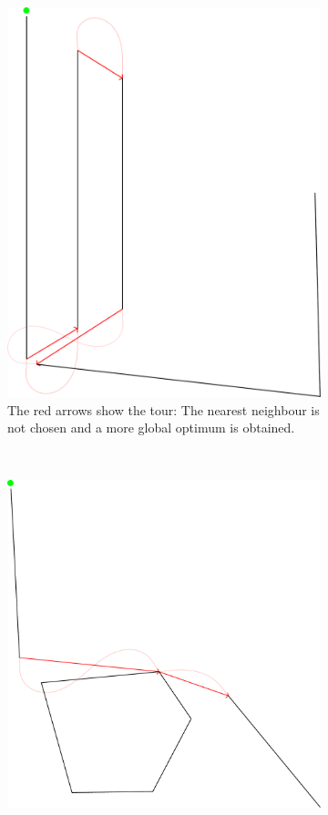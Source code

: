 \begin{figure}
\begin{subfigure}{0.45\textwidth}
\includegraphics[width=1\textwidth]{images/results/TSP/TSP_Verification_1.pdf}
\caption{The red arrows show the tour: The nearest neighbour is not chosen and a more global optimum is obtained.}
\end{subfigure}
~
\begin{subfigure}{0.45\textwidth}
\includegraphics[width=1\textwidth]{images/results/TSP/TSP_Verification_2.pdf}

\end{subfigure}
\end{figure}

